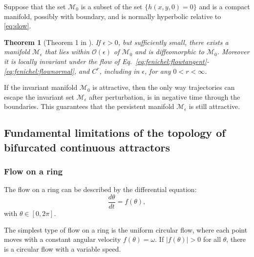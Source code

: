 \documentclass{article} %
\newcounter{ct}
\newcommand{\manifold}{\mathcal{M}}
\newtheorem{theorem}{Theorem}
\theoremstyle{definition}
\theoremstyle{remark}
\begin{document}
Suppose that the set \(\manifold_0\)  is a subset of the set \(\{h(x, y, 0) = 0\}\) and is a compact manifold, possibly with boundary, and is normally hyperbolic relative to \ref{eq:slow}.


\begin{theorem}[Theorem 1 in \citep{Jones1995}]
If \(\epsilon >0\), but sufficiently small, there exists a manifold \(\manifold_\epsilon\) that lies within \(\mathcal{O}(\epsilon)\) of \(\manifold_0\) and is diffeomorphic to \(\manifold_0\).
 Moreover it is locally invariant under the flow of Eq.~\ref{eq:fenichel:flowtangent}-\ref{eq:fenichel:flownormal}, and \(C^r\), including in \(\epsilon\), for any \(0<r< \infty\).
\end{theorem}


If the invariant manifold \(\manifold_0\) is attractive, then the only way trajectories can escape the invariant set \(\manifold_\epsilon\) after perturbation, is in negative time through the boundaries.
This guarantees that the persistent manifold \(\manifold_\epsilon\) is still attractive.


\subsection{Fundamental limitations of the topology of bifurcated continuous attractors}

\subsubsection{Flow on a ring}
The flow on a ring can be described by the differential equation\citep{hirsch2013differential}:
\begin{equation}
\frac{d\theta}{dt} = f(\theta),
\end{equation}
with \(\theta\in[0,2\pi].\)

The simplest type of flow on a ring is the uniform circular flow, where each point moves with a constant angular velocity \(f(\theta)=\omega\).
If \(|f(\theta)|>0\) for all \(\theta\), there is a circular flow with a variable speed.
\end{document}
